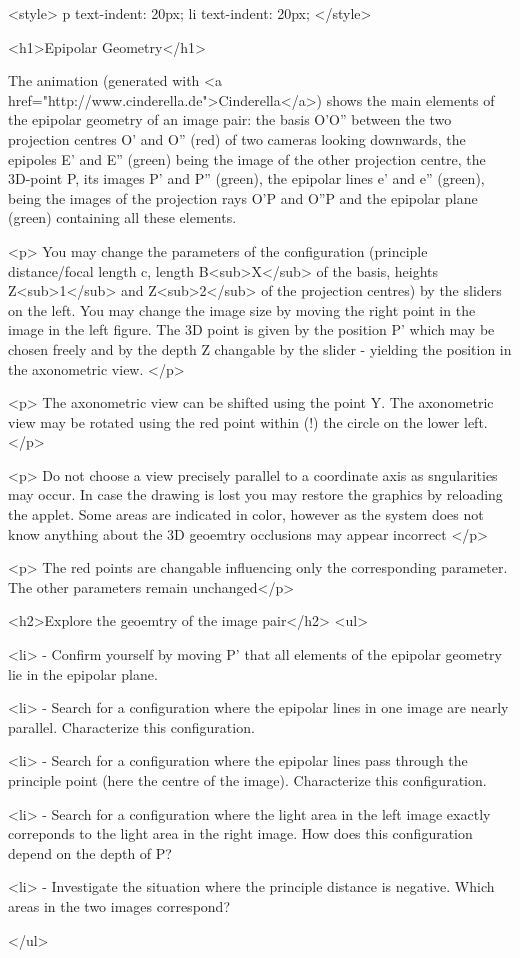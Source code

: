 <style>
p {
  text-indent: 20px;
}
li {
  text-indent: 20px;
}
</style>

<h1>Epipolar Geometry</h1> 
 
The animation (generated with <a
    href="http://www.cinderella.de">Cinderella</a>) 
    shows the main elements of the epipolar geometry of an image pair:
    the basis O'O'' between the two projection centres O' and O'' (red) of two cameras looking downwards, the epipoles E' and E'' (green) being the image of the other projection centre, the 3D-point P, its images P' and P'' (green), the epipolar lines e' and e'' (green), being the images of the projection rays O'P and O''P and the epipolar plane (green) containing all these elements.

    <p> You may change the parameters of the configuration (principle distance/focal length c, length B<sub>X</sub> of the basis, heights  Z<sub>1</sub> and Z<sub>2</sub> of the projection centres) by the sliders on the left. 
    You may change the image size by moving the right point in the image in the left figure. The 3D point is given by the  position P' which may be chosen freely and by the depth Z changable by the slider - yielding the position in the axonometric view.
    </p>

    <p> The axonometric view can be shifted using the point Y. The axonometric view may be rotated using the red point within (!) the circle on the lower left. </p>

    <p> Do not choose a view precisely parallel to a coordinate axis as sngularities may occur. In case the drawing is lost you may restore the graphics by reloading the applet. Some areas are indicated in color, however as the system does not know anything about the 3D geoemtry occlusions may appear incorrect  </p>


    <p> The red points are changable influencing only the corresponding parameter. The other parameters remain unchanged</p>



    <h2>Explore the geoemtry of the image pair</h2>
    <ul>

      <li> - Confirm yourself by moving P' that all elements of the epipolar geometry lie in the epipolar plane.


	<li> - Search for a configuration where the epipolar lines in one image are nearly parallel. Characterize this configuration. 

	  <li> - Search for a configuration where the epipolar lines pass through the principle point (here the centre of the image). Characterize this configuration. 

	    <li>  - Search for a configuration where the light area in the left image exactly correponds to the light area in the right image. How does this configuration depend on the depth of P?

	      <li> - Investigate the situation where the principle distance is negative. Which areas in the two images correspond?

    </ul>